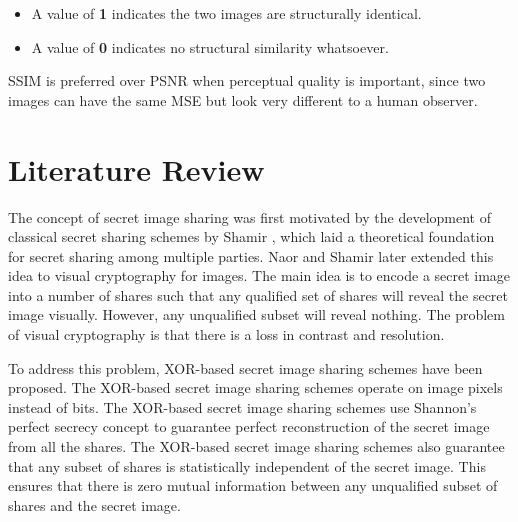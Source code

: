 \begin{itemize}
    \item A value of \textbf{1} indicates the two images are structurally identical.
    \item A value of \textbf{0} indicates no structural similarity whatsoever.
\end{itemize}

SSIM is preferred over PSNR when perceptual quality is important, since two images can have the same MSE but look very different to a human observer.


\section{Literature Review}
\label{sec:lad-litreview}
The concept of secret image sharing was first motivated by the development of classical secret sharing schemes by Shamir \cite{shamir1979share}, which laid a theoretical foundation for secret sharing among multiple parties. Naor and Shamir \cite{naor1995visual} later extended this idea to visual cryptography for images. The main idea is to encode a secret image into a number of shares such that any qualified set of shares will reveal the secret image visually. However, any unqualified subset will reveal nothing. The problem of visual cryptography is that there is a loss in contrast and resolution. 

To address this problem, XOR-based secret image sharing schemes have been proposed. The XOR-based secret image sharing schemes operate on image pixels instead of bits. The XOR-based secret image sharing schemes use Shannon's perfect secrecy concept \cite{shannon1949communication} to guarantee perfect reconstruction of the secret image from all the shares. The XOR-based secret image sharing schemes also guarantee that any subset of shares is statistically independent of the secret image. This ensures that there is zero mutual information between any unqualified subset of shares and the secret image.

